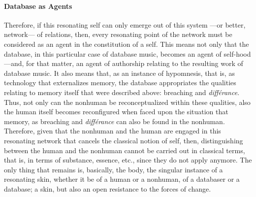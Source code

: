 \paragraph{Database as Agents}
Therefore, if this resonating self can only emerge out of this system ---or better, network--- of relations, then, every resonating point of the network must be considered as an agent in the constitution of a self. This means not only that the database, in this particular case of database music, becomes an agent of self-hood ---and, for that matter, an agent of authorship relating to the resulting work of database music. It also means that, as an instance of hypomnesis, that is, as technology that externalizes memory, the database appropriates the qualities relating to memory itself that were described above: breaching and \textit{différance}. Thus, not only can the nonhuman be reconceptualized within these qualities, also the human itself becomes reconfigured when faced upon the situation that memory, as breaching and \textit{différance} can also be found in the nonhuman. Therefore, given that the nonhuman and the human are engaged in this resonating network that cancels the classical notion of self, then, distinguishing between the human and the nonhuman cannot be carried out in classical terms, that is, in terms of substance, essence, etc., since they do not apply anymore. The only thing that remains is, basically, the body, the singular instance of a resonating skin, whether it be of a human or a nonhuman, of a databaser or a database; a skin, but also an open resistance to the forces of change.

